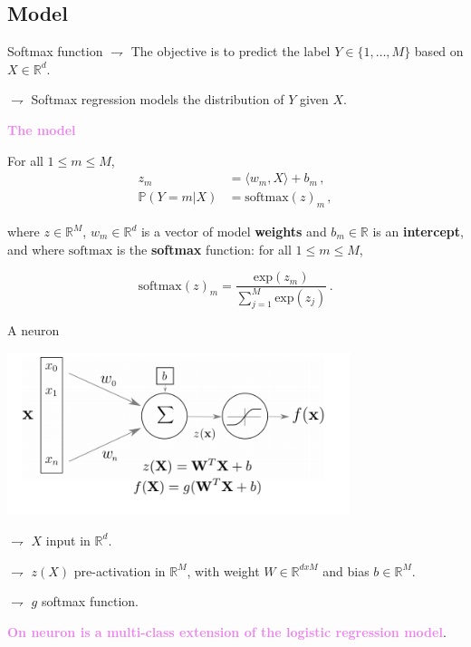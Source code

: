 \documentclass[9pt]{beamer}
\newcommand\R{\mathds{R}}
\renewcommand{\P}{\mathds{P}}
\begin{document}
\subsection{Model}

\begin{frame}{Softmax function}
$\rightharpoondown$ The objective is to \alert{predict the  label $Y\in\{1, \ldots, M\}$} based on $X\in\mathbb{R}^d$.

$\rightharpoondown$ Softmax regression \alert{models the distribution of $Y$ given $X$}.

\vspace{.3cm}

{\bf\textcolor{violet}{The model}} 

For all $1\leqslant m\leqslant M$,
\begin{align*}
z_m &= \langle w_m,X \rangle + b_m\,,\\
\P(Y = m| X) &= \mathrm{softmax}(z)_m\,,
\end{align*}

where $z\in\R^M$, $w_m \in \R^d$ is a vector of model \textbf{weights} and $b_m \in \R$ is an \textbf{intercept}, and where $\mathrm{softmax}$ is the \textbf{softmax} function: for all $1\leqslant m\leqslant M$,

$$
\mathrm{softmax}(z)_m = \frac{\mathrm{exp}(z_m)}{\sum_{j=1}^{M}\mathrm{exp}(z_j)}\,.
$$

\end{frame}

\begin{frame}{A neuron}

\begin{center}
\includegraphics[width = 0.75\textwidth]{neuron.png}
\end{center}

$\rightharpoondown$ $X$ \alert{input in $\R^d$}.

$\rightharpoondown$ $z(X)$ \alert{pre-activation in $\R^M$}, with \alert{weight $W\in\R^{dxM}$} and \alert{bias $b\in\R^M$}.

$\rightharpoondown$ $g$ \alert{softmax function}.

\vspace{.3cm}

{\bf\textcolor{violet}{On neuron is a multi-class extension of the logistic regression model}}. 

\end{frame}
\end{document}
